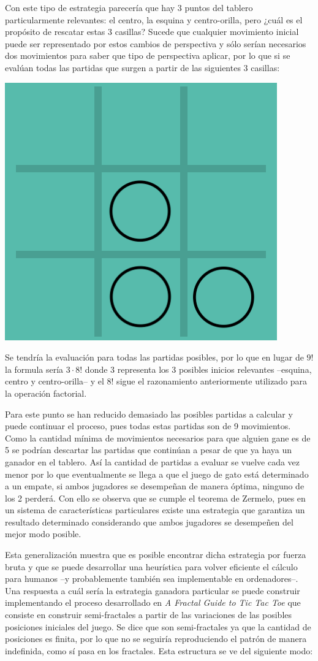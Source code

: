 \documentclass[twoside,openright,12pt,a4paper,spanish]{book}
\begin{document}
Con este tipo de estrategia parecería que hay 3 puntos del tablero particularmente relevantes: el centro, la esquina y centro-orilla, pero ¿cuál es el propósito de rescatar estas 3 casillas? Sucede que cualquier movimiento inicial puede ser representado por estos cambios de perspectiva y sólo serían necesarios dos movimientos para saber que tipo de perspectiva aplicar, por lo que si se evalúan todas las partidas que surgen a partir de las siguientes 3 casillas:

\begin{center}
    \includegraphics[width=5.0 cm,height=5.0 cm]{gato5.png}
\end{center}

Se tendría la evaluación para todas las partidas posibles, por lo que en lugar de $9!$ la formula sería $3 \cdot 8!$ donde 3 representa los 3 posibles inicios relevantes --esquina, centro y centro-orilla-- y el $8!$ sigue el razonamiento anteriormente utilizado para la operación factorial.

Para este punto se han reducido demasiado las posibles partidas a calcular y puede continuar el proceso, pues todas estas partidas son de 9 movimientos. Como la cantidad mínima de movimientos necesarios para que alguien gane es de 5 se podrían descartar las partidas que continúan a pesar de que ya haya un ganador en el tablero. Así la cantidad de partidas a evaluar se vuelve cada vez menor por lo que eventualmente se llega a que el juego de gato está determinado a un empate, si ambos jugadores se desempeñan de manera óptima, ninguno de los 2 perderá. Con ello se observa que se cumple el teorema de Zermelo, pues en un sistema de características particulares existe una estrategia que garantiza un resultado determinado considerando que ambos jugadores se desempeñen del mejor modo posible. 

Esta generalización muestra que es posible encontrar dicha estrategia por fuerza bruta y que se puede desarrollar una heurística para volver eficiente el cálculo para humanos --y probablemente también sea implementable en ordenadores--. Una respuesta a cu\'al ser\'ia la estrategia ganadora particular se puede construir implementando el proceso desarrollado en \emph{A Fractal Guide to Tic Tac Toe} \cite{stewart2000fractal} que consiste en construir semi-fractales a partir de las variaciones de las posibles posiciones iniciales del juego. Se dice que son semi-fractales ya que la cantidad de posiciones es finita, por lo que no se seguir\'ia reproduciendo el patrón de manera indefinida, como sí pasa en los fractales. Esta estructura se ve del siguiente modo:
\end{document}
